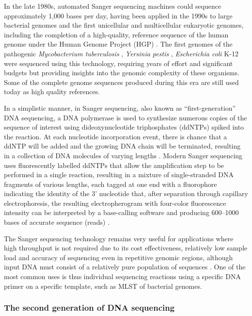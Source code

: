 In the late 1980s, automated Sanger sequencing machines could sequence approximately 1,000 bases per day, having been applied in the 1990s to large bacterial genomes and the first unicellular and multicellular eukaryotic genomes, including the completion of a high-quality, reference sequence of the human genome under the Human Genome Project (HGP) \citep{koch_sequencing_2021, collins_human_1995}. The first genomes of the pathogenic \textit{Mycobacterium tuberculosis} \citep{cole_deciphering_1998}, \textit{Yersinia pestis} \citep{parkhill_genome_2001}, \textit{Escherichia coli} K-12 \citep{blattner_complete_1997} were sequenced using this technology, requiring years of effort and significant budgets but providing insights into the genomic complexity of these organisms. Some of the complete genome sequences produced during this era are still used today as high quality references. 

In a simplistic manner, in Sanger sequencing, also known as “first-generation” DNA sequencing, a DNA polymerase is used to synthesize numerous copies of the sequence of interest using dideoxynucleotide triphosphates (ddNTPs) spiked into the reaction. At each nucleotide incorporation event, there is chance that a ddNTP will be added and the growing DNA chain will be terminated, resulting in a collection of DNA molecules of varying lengths \citep{sanger_dna_1977, hagemann_overview_2015}. Modern Sanger sequencing uses fluorescently labelled ddNTPs that allow the amplification step to be performed in a single reaction, resulting in a mixture of single-stranded DNA fragments of various lengths, each tagged at one end with a fluorophore indicating the identity of the 3' nucleotide that, after separation through capillary electrophoresis, the resulting electropherogram with four-color fluorescence intensity can be interpreted by a base-calling software and producing 600–1000 bases of accurate sequence (reads) \citep{hagemann_overview_2015}. 

The Sanger sequencing technology remains very useful for applications where high throughput is not required due to its cost effectiveness, relatively low sample load and accuracy of sequencing even in repetitive genomic regions, although input DNA must consist of a relatively pure population of sequences \citep{slatko_overview_2018}. One of the most common uses is thus individual sequencing reactions using a specific DNA primer on a specific template, such as MLST of bacterial genomes. 

\subsubsection{The second generation of DNA sequencing} \label{ssec:2nd_gen_seq}

